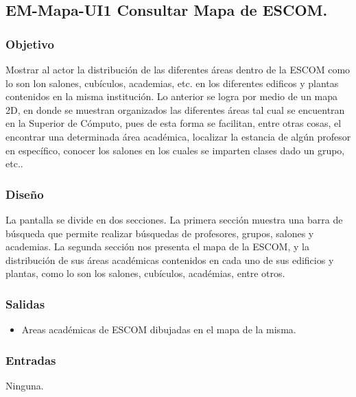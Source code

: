 
\subsection{EM-Mapa-UI1 Consultar Mapa de ESCOM.}

\subsubsection{Objetivo}
	\noindent
	Mostrar al actor la distribución de las diferentes áreas dentro de la ESCOM como lo son lon salones,
	cubículos, academias, etc. en los diferentes edificos y plantas contenidos en la misma institución. 
	Lo anterior se logra por medio de un mapa 2D, en donde se muestran organizados las diferentes áreas
	tal cual se encuentran en la Superior de Cómputo, pues de esta forma se facilitan, entre otras cosas,
	el encontrar una determinada área académica, localizar la estancia de algún profesor en específico,
	conocer los salones en los cuales se imparten clases dado un grupo, etc..

\subsubsection{Diseño}
	\noindent
	La pantalla se divide en dos secciones. La primera sección muestra una barra de búsqueda que permite 
	realizar búsquedas de profesores, grupos, salones y academias. La segunda sección nos presenta el
	mapa de la ESCOM, y la distribución de sus áreas académicas contenidos en cada uno de sus edificios y
	plantas, como lo son los salones, cubículos, académias, entre otros. 

\pagebreak
{}

\subsubsection{Salidas}
	\begin{itemize}
		\item Areas académicas de ESCOM dibujadas en el mapa de la misma.
	\end{itemize}

\subsubsection{Entradas}
	\noindent
	Ninguna. 

